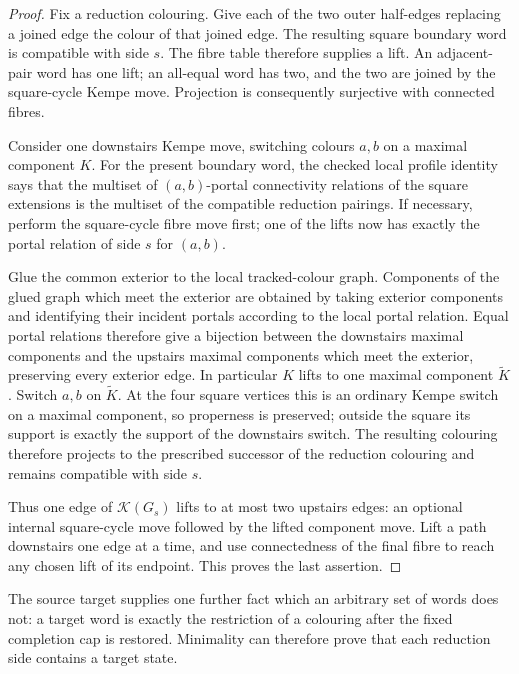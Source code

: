 \begin{proof}
Fix a reduction colouring.  Give each of the two outer half-edges replacing
a joined edge the colour of that joined edge.  The resulting square boundary
word is compatible with side \(s\).  The fibre table therefore supplies a
lift.  An adjacent-pair word has one lift; an all-equal word has two, and the
two are joined by the square-cycle Kempe move.  Projection is consequently
surjective with connected fibres.

Consider one downstairs Kempe move, switching colours \(a,b\) on a maximal
component \(K\).  For the present boundary word, the checked local profile
identity says that the multiset of \((a,b)\)-portal connectivity relations of
the square extensions is the multiset of the compatible reduction pairings.
If necessary, perform the square-cycle fibre move first; one of the lifts now
has exactly the portal relation of side \(s\) for \((a,b)\).

Glue the common exterior to the local tracked-colour graph.  Components of
the glued graph which meet the exterior are obtained by taking exterior
components and identifying their incident portals according to the local
portal relation.  Equal portal relations therefore give a bijection between
the downstairs maximal components and the upstairs maximal components which
meet the exterior, preserving every exterior edge.  In particular \(K\)
lifts to one maximal component \(\widetilde K\).  Switch \(a,b\) on
\(\widetilde K\).  At the four square vertices this is an ordinary Kempe
switch on a maximal component, so properness is preserved; outside the square
its support is exactly the support of the downstairs switch.  The resulting
colouring therefore projects to the prescribed successor of the reduction
colouring and remains compatible with side \(s\).

Thus one edge of \(\mathcal K(G_s)\) lifts to at most two upstairs edges: an
optional internal square-cycle move followed by the lifted component move.
Lift a path downstairs one edge at a time, and use connectedness of the final
fibre to reach any chosen lift of its endpoint.  This proves the last
assertion.
\end{proof}

The source target supplies one further fact which an arbitrary set of words
does not: a target word is exactly the restriction of a colouring after the
fixed completion cap is restored.  Minimality can therefore prove that each
reduction side contains a target state.

